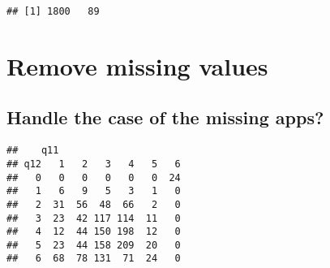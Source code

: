 \documentclass[]{article}
\newenvironment{Shaded}{\begin{snugshade}}{\end{snugshade}}
\newcommand{\KeywordTok}[1]{\textcolor[rgb]{0.13,0.29,0.53}{\textbf{#1}}}
\newcommand{\DataTypeTok}[1]{\textcolor[rgb]{0.13,0.29,0.53}{#1}}
\newcommand{\DecValTok}[1]{\textcolor[rgb]{0.00,0.00,0.81}{#1}}
\newcommand{\FloatTok}[1]{\textcolor[rgb]{0.00,0.00,0.81}{#1}}
\newcommand{\StringTok}[1]{\textcolor[rgb]{0.31,0.60,0.02}{#1}}
\newcommand{\OtherTok}[1]{\textcolor[rgb]{0.56,0.35,0.01}{#1}}
\newcommand{\OperatorTok}[1]{\textcolor[rgb]{0.81,0.36,0.00}{\textbf{#1}}}
\newcommand{\NormalTok}[1]{#1}
\begin{document}
\begin{verbatim}
## [1] 1800   89
\end{verbatim}

\begin{Shaded}
\end{Shaded}

\section{Remove missing values}\label{remove-missing-values}

\subsection{Handle the case of the missing
apps?}\label{handle-the-case-of-the-missing-apps}

\begin{Shaded}
\end{Shaded}

\begin{verbatim}
##    q11
## q12   1   2   3   4   5   6
##   0   0   0   0   0   0  24
##   1   6   9   5   3   1   0
##   2  31  56  48  66   2   0
##   3  23  42 117 114  11   0
##   4  12  44 150 198  12   0
##   5  23  44 158 209  20   0
##   6  68  78 131  71  24   0
\end{verbatim}
\end{document}
